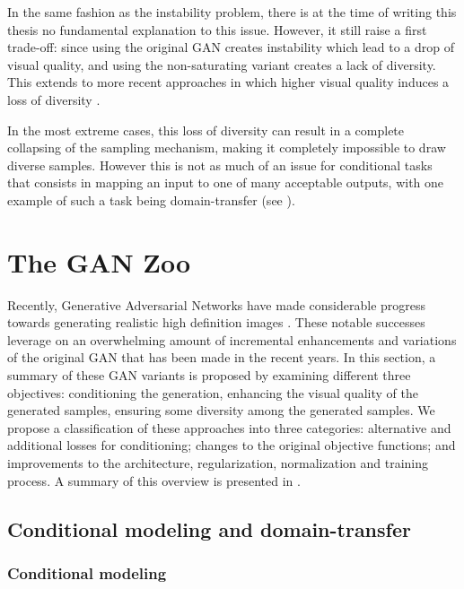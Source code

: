 In the same fashion as the instability problem, there is at the time of writing this thesis no fundamental explanation to this issue. However, it still raise a first trade-off: since using the original \ac{GAN} creates instability which lead to a drop of visual quality, and using the non-saturating variant creates a lack of diversity. This extends to more recent approaches in which higher visual quality induces a loss of diversity \citep{Brock2018}.

In the most extreme cases, this loss of diversity can result in a complete collapsing of the sampling mechanism, making it completely impossible to draw diverse samples. However this is not as much of an issue for conditional tasks that consists in mapping an input to one of many acceptable outputs, with one example of such a task being domain-transfer (see ). 



\section{The GAN Zoo}

Recently, Generative Adversarial Networks have made considerable progress towards generating realistic high definition images \citep{Brock2018, Karras2020, Wang2018b}. These notable successes leverage on an overwhelming amount of incremental enhancements and variations of the original GAN \citep{Hindupur2017} that has been made in the recent years. In this section, a summary of these GAN variants is proposed by examining different three objectives: conditioning the generation, enhancing the visual quality of the generated samples, ensuring some diversity among the generated samples. We propose a classification of these approaches into three categories: alternative and additional losses for conditioning;  changes to the original objective functions; and improvements to the  architecture, regularization, normalization and training process. A summary of this overview is presented in .


\subsection{Conditional modeling and domain-transfer}


\subsubsection{Conditional modeling}

